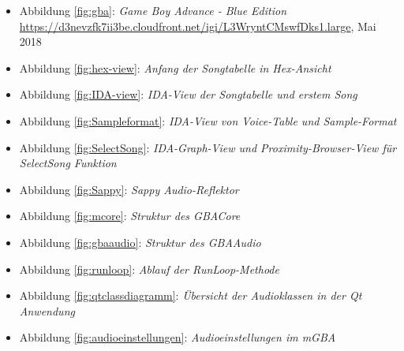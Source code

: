 \documentclass[11pt,a4paper]{scrartcl}
\begin{document}
\begin{itemize}
    \item Abbildung \ref{fig:gba}: \textit{Game Boy Advance - Blue Edition}\newline
    \url{https://d3nevzfk7ii3be.cloudfront.net/igi/L3WryntCMswfDks1.large}, Mai 2018

    \item Abbildung \ref{fig:hex-view}: \textit{Anfang der Songtabelle in Hex-Ansicht}
    
    \item Abbildung \ref{fig:IDA-view}: \textit{IDA-View der Songtabelle und erstem Song}
    
    \item Abbildung \ref{fig:Sampleformat}: \textit{IDA-View von Voice-Table und Sample-Format}
		
		\item Abbildung \ref{fig:SelectSong}: \textit{IDA-Graph-View und Proximity-Browser-View f\"ur SelectSong Funktion}
		
		\item Abbildung \ref{fig:Sappy}: \textit{Sappy Audio-Reflektor}
    
    \item Abbildung \ref{fig:mcore}: \textit{Struktur des GBACore}
    
    \item Abbildung \ref{fig:gbaaudio}: \textit{Struktur des GBAAudio}
    
    \item Abbildung \ref{fig:runloop}: \textit{Ablauf der RunLoop-Methode}
    
    \item Abbildung \ref{fig:qtclassdiagramm}: \textit{\"Ubersicht der Audioklassen in der Qt Anwendung}
    
    \item Abbildung \ref{fig:audioeinstellungen}: \textit{Audioeinstellungen im mGBA}
\end{itemize}
\end{document}
